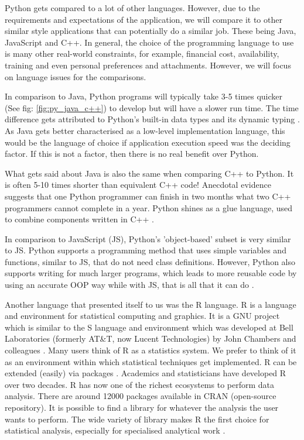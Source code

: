 	
	Python gets compared to a lot of other languages. However, due to the requirements and expectations of the application, we will compare it to other similar style applications that can potentially do a similar job. These being Java, JavaScript and C++. In general, the choice of the programming language to use is many other real-world constraints, for example, financial cost, availability, training and even personal preferences and attachments. However, we will focus on language issues for the comparisons.
	
	In comparison to Java, Python programs will typically take 3-5 times quicker (See fig: \ref{fig:py_java_c++}) to develop but will have a slower run time. The time difference gets attributed to Python's built-in data types and its dynamic typing \cite{python_comparison}. As Java gets better characterised as a low-level implementation language, this would be the language of choice if application execution speed was the deciding factor. If this is not a factor, then there is no real benefit over Python.
	
	What gets said about Java is also the same when comparing C++ to Python. It is often 5-10 times shorter than equivalent C++ code! Anecdotal evidence suggests that one Python programmer can finish in two months what two C++ programmers cannot complete in a year. Python shines as a glue language, used to combine components written in C++ \cite{python_comparison}.
	
	In comparison to JavaScript (JS), Python's 'object-based' subset is very similar to JS. Python supports a programming method that uses simple variables and functions, similar to JS, that do not need class definitions. However, Python also supports writing for much larger programs, which leads to more reusable code by using an accurate OOP way while with JS, that is all that it can do \cite{python_comparison}.
	
	
	Another language that presented itself to us was the R language. R is a language and environment for statistical computing and graphics. It is a GNU project which is similar to the S language and environment which was developed at Bell Laboratories (formerly AT\&T, now Lucent Technologies) by John Chambers and colleagues \cite{r_project}. Many users think of R as a statistics system. We prefer to think of it as an environment within which statistical techniques get implemented. R can be extended (easily) via packages \cite{r_project}. Academics and statisticians have developed R over two decades. R has now one of the richest ecosystems to perform data analysis. There are around 12000 packages available in CRAN (open-source repository). It is possible to find a library for whatever the analysis the user wants to perform. The wide variety of library makes R the first choice for statistical analysis, especially for specialised analytical work \cite{r_vs_py}.
	
